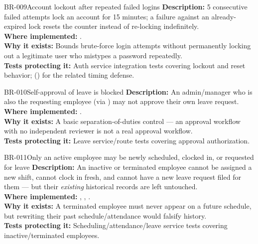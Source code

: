 \begin{businessrule}{BR-009}{Account lockout after repeated failed logins}
\textbf{Description:} 5 consecutive failed attempts lock an account for
15 minutes; a failure against an already-expired lock resets the
counter instead of re-locking indefinitely.\\
\textbf{Where implemented:} .\\
\textbf{Why it exists:} Bounds brute-force login attempts without
permanently locking out a legitimate user who mistypes a password
repeatedly.\\
\textbf{Tests protecting it:} Auth service integration tests covering
lockout and reset behavior; 
() for the related timing defense.
\end{businessrule}

\begin{businessrule}{BR-010}{Self-approval of leave is blocked}
\textbf{Description:} An admin/manager who is also the requesting
employee (via ) may not approve their own
leave request.\\
\textbf{Where implemented:} .\\
\textbf{Why it exists:} A basic separation-of-duties control --- an
approval workflow with no independent reviewer is not a real approval
workflow.\\
\textbf{Tests protecting it:} Leave service/route tests covering
approval authorization.
\end{businessrule}

\begin{businessrule}{BR-011}{Only an active employee may be newly scheduled, clocked in, or requested for leave}
\textbf{Description:} An inactive or terminated employee cannot be
assigned a new shift, cannot clock in fresh, and cannot have a new
leave request filed for them --- but their \emph{existing} historical
records are left untouched.\\
\textbf{Where implemented:} ,
,
.\\
\textbf{Why it exists:} A terminated employee must never appear on a
future schedule, but rewriting their past schedule/attendance would
falsify history.\\
\textbf{Tests protecting it:} Scheduling/attendance/leave service tests
covering inactive/terminated employees.
\end{businessrule}

